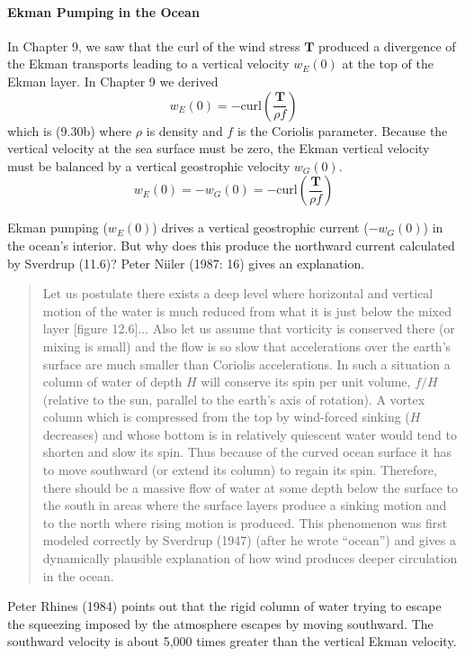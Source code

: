 \paragraph{Ekman Pumping in the Ocean}
In Chapter 9, we saw that the curl of the wind
stress $\mathbf{T}$ produced a divergence of the Ekman
transports leading to a vertical velocity $w_E (0)$ at the top of the
Ekman layer. In Chapter 9 we derived
\begin{equation}
w_E (0) = -\text{curl}\left(\frac{\mathbf{T}}{\rho f} \right)
\end{equation}
which is (9.30b) where $\rho$ is density and $f$ is the Coriolis parameter. Because the vertical velocity at the sea surface must be zero, the Ekman vertical
velocity must be balanced by a vertical geostrophic velocity $w_G(0)$.
\begin{equation}
w_E (0) = - w_G (0) = -\text{curl}\left(\frac{\mathbf{T}}{\rho f} \right)
\end{equation}

Ekman pumping ($w_E (0)$) drives a vertical geostrophic current ($-w_G (0)$) in
the ocean's interior. But why does this produce the northward current calculated by
Sverdrup (11.6)? Peter Niiler (1987: 16) gives an explanation.

\begin{quotation} \small
Let us postulate there exists a deep level where horizontal and vertical motion
of the water is much reduced from what it is just below the mixed
layer [figure 12.6]$\ldots$ Also let us assume that
vorticity is conserved there (or mixing is small) and the flow is so slow that accelerations
over the earth's surface are much smaller than Coriolis accelerations. In such a
situation a column of water of depth $H$ will conserve its spin per unit
volume, $f/H$ (relative to the sun, parallel to the earth's axis of rotation).
A vortex column which is compressed from the top by wind-forced sinking ($H$
decreases) and whose bottom is in relatively quiescent water would tend to
shorten and slow its spin. Thus because of the curved ocean surface it has to
move southward (or extend its column) to regain its spin. Therefore, there
should be a massive flow of water at some depth below the surface to the south
in areas where the surface layers produce a sinking motion and to the north
where rising motion is produced. This phenomenon was first modeled correctly by
Sverdrup (1947) (after he wrote ``ocean'') and gives a dynamically plausible
explanation of how wind produces deeper circulation in the ocean.
\end{quotation}
Peter Rhines (1984) points out that the rigid column of water trying to escape the
squeezing imposed by the atmosphere escapes by moving southward. The southward
velocity is about 5,000 times greater than the vertical Ekman velocity.

